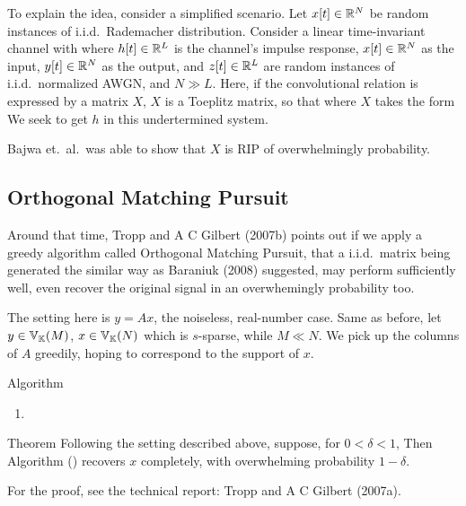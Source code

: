 To explain the idea, consider a simplified scenario.
Let \(x[t] \in \mathbb{R}^N\) be random instances of i.i.d.\ Rademacher distribution.
Consider a linear time-invariant channel with
%
%
where \(h[t] \in \mathbb{R}^L\) is the channel's impulse response, \(x[t] \in \mathbb{R}^N\) as the input, \(y[t] \in \mathbb{R}^N\) as the output, and \(z[t] \in \mathbb{R}^L\) are random instances of i.i.d.\ normalized AWGN, and \(N \gg L\).
Here, if the convolutional relation is expressed by a matrix \(X\), \(X\) is a Toeplitz matrix, so that
%
%
where \(X\) takes the form
%
%
We seek to get \(h\) in this undertermined system.

Bajwa et.\ al.\ was able to show that \(X\) is RIP of overwhelmingly probability.

\subsection{Orthogonal Matching Pursuit}

Around that time, Tropp and A C Gilbert (2007b) points out if we apply a greedy algorithm called Orthogonal Matching Pursuit, that a i.i.d.\ matrix being generated the similar way as Baraniuk (2008) suggested, may perform sufficiently well, even recover the original signal in an overwhemingly probability too.

The setting here is \(y =Ax\), the noiseless, real-number case.
Same as before, let \(y \in \mathbb{V}_{\mathbb{K}}(M)\), \(x \in \mathbb{V}_{\mathbb{K}}(N)\) which is \(s\)-sparse, while \(M \ll N\).
We pick up the columns of \(A\) greedily, hoping to correspond to the support of \(x\).

\Result
{Algorithm}
{
\begin{enumerate}
\item
\end{enumerate}
}

\Result
{Theorem}
{
   Following the setting described above, suppose, for \(0 <\delta <1\),
%
%
Then Algorithm () recovers \(x\) completely, with overwhelming probability \(1-\delta\).
}

For the proof, see the technical report: Tropp and A C Gilbert (2007a).

